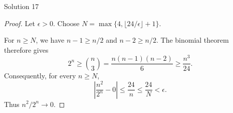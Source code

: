 \documentclass{beamer}
\begin{document}
\begin{frame}{Solution 17}
\begin{proof}
Let $\epsilon>0$. Choose
$N=\max\{4,\lfloor24/\epsilon\rfloor+1\}$.
\medskip

For $n\geq N$, we have $n-1\geq n/2$ and $n-2\geq n/2$.
The binomial theorem therefore gives
\[
  2^n\geq\binom{n}{3}
  =\frac{n(n-1)(n-2)}{6}\geq\frac{n^3}{24}.
\]
Consequently, for every $n\geq N$,
\[
  \left\lvert\frac{n^2}{2^n}-0\right\rvert
  \leq\frac{24}{n}\leq\frac{24}{N}<\epsilon.
\]
Thus $n^2/2^n\to0$.
\end{proof}
\end{frame}
\end{document}
